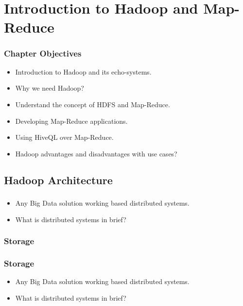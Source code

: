 \section{Introduction to Hadoop and Map-Reduce}


\begin{frame}
\frametitle{Chapter Objectives}

\begin{itemize}
	\item<1-> Introduction to Hadoop and its echo-systems. \pause
	\item<2-> Why we need Hadoop? \pause
	\item<3-> Understand the concept of HDFS and Map-Reduce.
	\item<4-> Developing Map-Reduce applications. \pause
	\item<5-> Using HiveQL over Map-Reduce. \pause
	\item<6-> Hadoop advantages and disadvantages with use cases? \pause
\end{itemize}

\end{frame}


\subsection{Hadoop Architecture}
\begin{frame}
\frametitle{\subsecname}
\begin{itemize}[<+->]
	\item Any Big Data solution working based distributed systems.
	\item What is distributed systems in brief?
\end{itemize}
\end{frame}



\subsubsection{Storage}
\begin{frame}
\frametitle{Storage}
\begin{itemize}[<+->]
	\item Any Big Data solution working based distributed systems.
	\item What is distributed systems in brief?
\end{itemize}
\end{frame}

